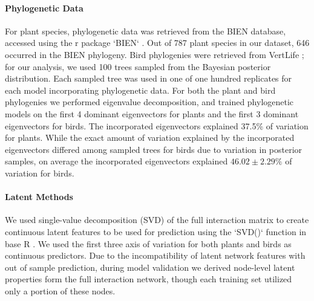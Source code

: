 \documentclass[openacc]{rsproca_new}%
\begin{document}
\paragraph{Phylogenetic Data}
For plant species, phylogenetic data was retrieved from the BIEN database, accessed using the r package `BIEN` \cite{maitner2018bien}. Out of 787 plant species in our dataset, 646 occurred in the BIEN phylogeny. Bird phylogenies were retrieved from VertLife \cite{jetz2012}; for our analysis, we used 100 trees sampled from the Bayesian posterior distribution. Each sampled tree was used in one of one hundred replicates for each model incorporating phylogenetic data. For both the plant and bird phylogenies we performed eigenvalue decomposition, and trained phylogenetic models on the first 4 dominant eigenvectors for plants and the first 3 dominant eigenvectors for birds. The incorporated eigenvectors explained 37.5\% of variation for plants. While the exact amount of variation explained by the incorporated eigenvectors differed among sampled trees for birds due to variation in posterior samples, on average the incorporated eigenvectors explained $46.02\pm 2.29\%$ of variation for birds. 


\paragraph{Latent Methods} We used single-value decomposition (SVD) of the full interaction matrix to create continuous latent features to be used for prediction using the `SVD()` function in base R \cite{RCore}. We used the first three axis of variation for both plants and birds as continuous predictors. Due to the incompatibility of latent network features with out of sample prediction, during model validation we derived node-level latent properties form the full interaction network, though each training set utilized only a portion of these nodes. 
\end{document}
